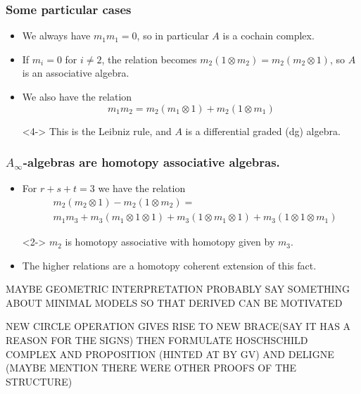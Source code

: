 \documentclass{beamer}
\theoremstyle{definition}
\begin{document}
\begin{frame}
\frametitle{Some particular cases}
\begin{itemize}
\item<1-> We always have $m_1m_1=0$, so in particular $A$ is a cochain complex.%
\item<2-> If $m_i=0$ for $i\neq 2$, the relation becomes $m_2(1\otimes m_2)=m_2(m_2\otimes 1)$, so $A$ is an associative algebra.
\item<3->  We also have the relation \[m_1m_2=m_2(m_1\otimes 1)+m_2(1\otimes m_1)\]%
\item[]<4-> This is the Leibniz rule, and $A$ is a differential graded (dg) algebra.
\end{itemize}
\end{frame}


\begin{frame}
\frametitle{$A_\infty$-algebras are homotopy associative algebras.}
\begin{itemize}
\item<1-> For $r+s+t=3$ we have the relation
\begin{align*}
&m_2(m_2\otimes 1)-m_2(1\otimes m_2)=\\ %
&m_1m_3+m_3(m_1\otimes 1\otimes 1)+m_3(1\otimes m_1\otimes 1)+m_3(1\otimes 1\otimes m_1)
\end{align*}
\item[]<2-> $m_2$ is homotopy associative with homotopy given by $m_3$. %
\item<3-> The higher relations are a homotopy coherent extension of this fact. %
\end{itemize}
\end{frame}

\begin{frame}
MAYBE GEOMETRIC INTERPRETATION
PROBABLY SAY SOMETHING ABOUT MINIMAL MODELS SO THAT DERIVED CAN BE MOTIVATED
\end{frame}

\begin{frame}
NEW CIRCLE OPERATION GIVES RISE TO NEW BRACE(SAY IT HAS A REASON FOR THE SIGNS)
THEN FORMULATE HOSCHSCHILD COMPLEX AND PROPOSITION (HINTED AT BY GV) AND DELIGNE (MAYBE MENTION THERE WERE OTHER PROOFS OF THE STRUCTURE)
\end{frame}
\end{document}
